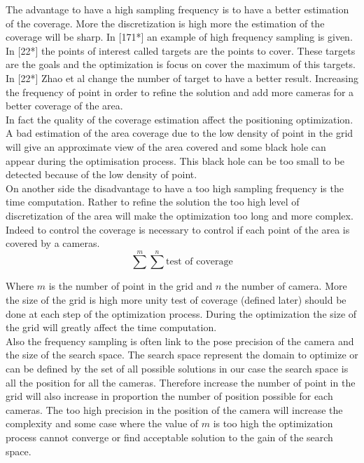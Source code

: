 %
 
The advantage to have a high sampling frequency is to have a better estimation of the coverage. More the discretization is high more the estimation of the coverage will be sharp. In [171*] an example of high frequency sampling is given. 
In [22*] the points of interest called targets are the points to cover. These targets are the goals and the optimization is focus on cover the maximum of this targets. In [22*] Zhao et al change the number of target to have a better result. Increasing the frequency of point in order to refine the solution and add more cameras for a better coverage of the area.  \\
In fact the quality of the coverage estimation affect the positioning optimization. %
A bad estimation of the area coverage due to the low density of point in the grid will give an approximate view of the area covered and some black hole can appear during the optimisation process. This black hole can be too small to be detected because of the low density of point. 
\\
On another side the disadvantage to have a too high sampling frequency is the time computation. Rather to refine the solution the too high level of discretization of the area will make the optimization too long and more complex. Indeed to control the coverage is necessary to control if each point of the area is covered by a cameras.  
\begin{equation} 
	\sum^m \sum^n \mbox{test of coverage}
\end{equation}

Where $m$ is the number of point in the grid and $n$ the number of camera.  More the size of the grid is high more unity test of coverage (defined later) should be done at each step of the optimization process. During the optimization the size of the grid will greatly affect the time computation.  \\

Also the frequency sampling is often link to the pose precision of the camera and the size of the search space. The search space represent the domain to optimize or can be defined by the set of all possible solutions in our case the search space is all the position for all the cameras. 
Therefore increase the number of point in the grid will also increase in proportion the number of position possible for each cameras. The too high precision in the position of the camera will increase the complexity and some case where the value of $m$ is too high the optimization process cannot converge or find acceptable solution to the gain of the search space. \\ 

